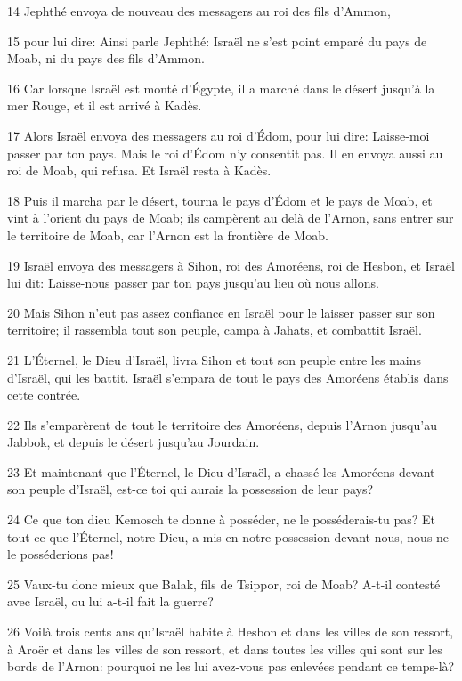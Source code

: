 \par 14 Jephthé envoya de nouveau des messagers au roi des fils d'Ammon,
\par 15 pour lui dire: Ainsi parle Jephthé: Israël ne s'est point emparé du pays de Moab, ni du pays des fils d'Ammon.
\par 16 Car lorsque Israël est monté d'Égypte, il a marché dans le désert jusqu'à la mer Rouge, et il est arrivé à Kadès.
\par 17 Alors Israël envoya des messagers au roi d'Édom, pour lui dire: Laisse-moi passer par ton pays. Mais le roi d'Édom n'y consentit pas. Il en envoya aussi au roi de Moab, qui refusa. Et Israël resta à Kadès.
\par 18 Puis il marcha par le désert, tourna le pays d'Édom et le pays de Moab, et vint à l'orient du pays de Moab; ils campèrent au delà de l'Arnon, sans entrer sur le territoire de Moab, car l'Arnon est la frontière de Moab.
\par 19 Israël envoya des messagers à Sihon, roi des Amoréens, roi de Hesbon, et Israël lui dit: Laisse-nous passer par ton pays jusqu'au lieu où nous allons.
\par 20 Mais Sihon n'eut pas assez confiance en Israël pour le laisser passer sur son territoire; il rassembla tout son peuple, campa à Jahats, et combattit Israël.
\par 21 L'Éternel, le Dieu d'Israël, livra Sihon et tout son peuple entre les mains d'Israël, qui les battit. Israël s'empara de tout le pays des Amoréens établis dans cette contrée.
\par 22 Ils s'emparèrent de tout le territoire des Amoréens, depuis l'Arnon jusqu'au Jabbok, et depuis le désert jusqu'au Jourdain.
\par 23 Et maintenant que l'Éternel, le Dieu d'Israël, a chassé les Amoréens devant son peuple d'Israël, est-ce toi qui aurais la possession de leur pays?
\par 24 Ce que ton dieu Kemosch te donne à posséder, ne le posséderais-tu pas? Et tout ce que l'Éternel, notre Dieu, a mis en notre possession devant nous, nous ne le posséderions pas!
\par 25 Vaux-tu donc mieux que Balak, fils de Tsippor, roi de Moab? A-t-il contesté avec Israël, ou lui a-t-il fait la guerre?
\par 26 Voilà trois cents ans qu'Israël habite à Hesbon et dans les villes de son ressort, à Aroër et dans les villes de son ressort, et dans toutes les villes qui sont sur les bords de l'Arnon: pourquoi ne les lui avez-vous pas enlevées pendant ce temps-là?
